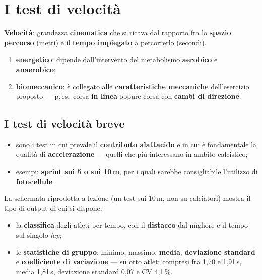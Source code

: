 \section{I test di velocità}

\textbf{Velocità}: grandezza \textbf{cinematica} che si ricava dal rapporto fra lo \textbf{spazio
percorso} (metri) e il \textbf{tempo impiegato} a percorrerlo (secondi).

\begin{enumerate}
  \item \textbf{energetico}: dipende dall'intervento del metabolismo \textbf{aerobico} e
    \textbf{anaerobico};
  \item \textbf{biomeccanico}: è collegato alle \textbf{caratteristiche meccaniche} dell'esercizio
    proposto --- p.\,es.\ corsa \textbf{in linea} oppure corsa con \textbf{cambi di direzione}.
\end{enumerate}

\subsection{I test di velocità breve}

\begin{itemize}
  \item sono i test in cui prevale il \textbf{contributo alattacido} e in cui è fondamentale la
    qualità di \textbf{accelerazione} --- quelli che più interessano in ambito calcistico;
  \item esempi: \textbf{sprint sui 5 o sui 10\,m}, per i quali sarebbe consigliabile l'utilizzo di
    \textbf{fotocellule}.
\end{itemize}

La schermata riprodotta a lezione (un test sui 10\,m, non su calciatori) mostra il tipo di output di
cui si dispone:
\begin{itemize}
  \item la \textbf{classifica} degli atleti per tempo, con il \textbf{distacco} dal migliore e il
    tempo sul singolo \textit{lap};
  \item le \textbf{statistiche di gruppo}: minimo, massimo, \textbf{media}, \textbf{deviazione
    standard} e \textbf{coefficiente di variazione} --- su otto atleti compresi fra 1,70 e 1,91\,s,
    media 1,81\,s, deviazione standard 0,07 e CV 4,1\,\%.
\end{itemize}

